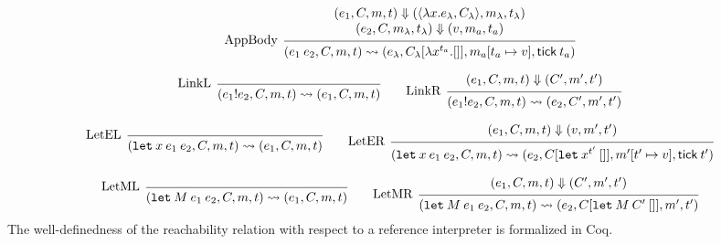 \documentclass{article}
\theoremstyle{definition}
\newcommand*{\mem}{m}
\newcommand*{\link}[2]{{#1}\mathtt{!}{#2}}
\newcommand*{\tick}{\mathsf{tick}}
\begin{document}
\[
  \begin{prooftree}
    \hypo{
      \begin{matrix}
        (e_{1}, C, \mem, t)
        \Downarrow
        (\langle\lambda x.e_{\lambda}, C_{\lambda}\rangle, \mem_{\lambda}, t_{\lambda}) \\
        (e_{2}, C, \mem_{\lambda}, t_{\lambda})
        \Downarrow
        (v, \mem_{a}, t_{a})
      \end{matrix}
    }
    \infer[left label={AppBody}]1{
    (e_{1}\:e_{2}, C, \mem, t)
    \rightsquigarrow
    (e_{\lambda}, C_{\lambda}[\lambda x^{t_{a}}.[]], \mem_{a}[t_{a}\mapsto v], \tick\:t_{a})
    }
  \end{prooftree}
\]

\[
  \begin{prooftree}
    \infer[left label=LinkL]0{
    (\link{e_{1}}{e_{2}}, C, \mem, t)
    \rightsquigarrow
    (e_{1}, C, \mem, t)
    }
  \end{prooftree}\qquad
  \begin{prooftree}
    \hypo{
      \begin{matrix}
        (e_{1}, C, \mem, t)
        \Downarrow
        (C', \mem', t')
      \end{matrix}
    }
    \infer[left label=LinkR]1{
    (\link{e_{1}}{e_{2}}, C, \mem, t)
    \rightsquigarrow
    (e_{2}, C', \mem', t')
    }
  \end{prooftree}
\]

\[
  \begin{prooftree}
    \infer[left label=LetEL]0{
    (\mathtt{let}\:x\:e_1\:e_2, C, \mem, t)
    \rightsquigarrow
    (e_{1}, C, \mem, t)
    }
  \end{prooftree}\qquad
  \begin{prooftree}
    \hypo{
      \begin{matrix}
        (e_{1}, C, \mem, t)
        \Downarrow
        (v, \mem', t')
      \end{matrix}
    }
    \infer[left label=LetER]1{
    (\mathtt{let}\:x\:e_1\:e_2, C, \mem, t)
    \rightsquigarrow
    (e_{2}, C[\mathtt{let}\:x^{t'}\:[]], \mem'[t'\mapsto v], \tick\:t')
    }
  \end{prooftree}
\]

\[
  \begin{prooftree}
    \infer[left label=LetML]0{
    (\mathtt{let}\:M\:e_{1}\:e_{2}, C, \mem, t)
    \rightsquigarrow
    (e_{1}, C, \mem, t)
    }
  \end{prooftree}\qquad
  \begin{prooftree}
    \hypo{
      \begin{matrix}
        (e_{1}, C, \mem, t)
        \Downarrow
        (C', \mem', t')
      \end{matrix}
    }
    \infer[left label=LetMR]1{
    (\mathtt{let}\:M\:e_{1}\:e_{2}, C, \mem, t)
    \rightsquigarrow
    (e_{2}, C[\mathtt{let}\:M\:C'\:[]], \mem', t')
    }
  \end{prooftree}
\]
The well-definedness of the reachability relation with respect to a reference interpreter is formalized in Coq.
\end{document}
